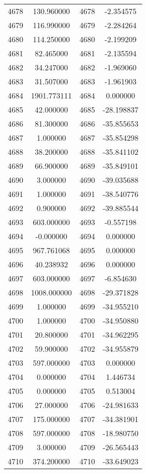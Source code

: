 \documentclass[12pt]{article}
\begin{document}
\begin{longtable}{@{}cccc@{}}
4678 & 130.960000 & 4678 & -2.354575 \\
4679 & 116.990000 & 4679 & -2.284264 \\
4680 & 114.250000 & 4680 & -2.199209 \\
4681 & 82.465000 & 4681 & -2.135594 \\
4682 & 34.247000 & 4682 & -1.969060 \\
4683 & 31.507000 & 4683 & -1.961903 \\
4684 & 1901.773111 & 4684 & 0.000000 \\
4685 & 42.000000 & 4685 & -28.198837 \\
4686 & 81.300000 & 4686 & -35.855653 \\
4687 & 1.000000 & 4687 & -35.854298 \\
4688 & 38.200000 & 4688 & -35.841102 \\
4689 & 66.900000 & 4689 & -35.849101 \\
4690 & 3.000000 & 4690 & -39.035688 \\
4691 & 1.000000 & 4691 & -38.540776 \\
4692 & 0.900000 & 4692 & -39.885544 \\
4693 & 603.000000 & 4693 & -0.557198 \\
4694 & -0.000000 & 4694 & 0.000000 \\
4695 & 967.761068 & 4695 & 0.000000 \\
4696 & 40.238932 & 4696 & 0.000000 \\
4697 & 603.000000 & 4697 & -6.854630 \\
4698 & 1008.000000 & 4698 & -29.371828 \\
4699 & 1.000000 & 4699 & -34.955210 \\
4700 & 1.000000 & 4700 & -34.950880 \\
4701 & 20.800000 & 4701 & -34.962295 \\
4702 & 59.900000 & 4702 & -34.955879 \\
4703 & 597.000000 & 4703 & 0.000000 \\
4704 & 0.000000 & 4704 & 1.446734 \\
4705 & 0.000000 & 4705 & 0.513004 \\
4706 & 27.000000 & 4706 & -24.981633 \\
4707 & 175.000000 & 4707 & -34.381901 \\
4708 & 597.000000 & 4708 & -18.980750 \\
4709 & 3.000000 & 4709 & -26.565443 \\
4710 & 374.200000 & 4710 & -33.649023 \\

\end{longtable}
\end{document}
